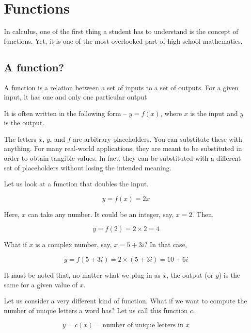 \chapter{Functions}
In calculus, one of the first thing a student has to understand is the concept of functions. Yet, it is one of the most overlooked part of high-school mathematics.

\section{A function?}

\begin{definition}[Function]
A function is a relation between a set of inputs to a set of outputs. For a given input, it has one and only one particular output
\end{definition}

It is often written in the following form -- $y = f(x)$, where $x$ is the input and $y$ is the output.

The letters $x$, $y$, and $f$ are arbitrary placeholders. You can substitute these with anything. For many real-world applications, they are meant to be substituted in order to obtain tangible values. In fact, they can be substituted with a different set of placeholders without losing the intended meaning.

Let us look at a function that doubles the input.

\begin{equation}
y = f(x) = 2x
\end{equation}

Here, $x$ can take any number. It could be an integer, say, $x = 2$. Then,

\[
y = f(2) = 2 \times 2 = 4
\]

What if $x$ is a complex number, say, $x = 5 + 3i$? In that case,

\[
y = f(5 + 3i) = 2 \times (5 + 3i) = 10 + 6i
\]

It must be noted that, no matter what we plug-in as $x$, the output (or $y$) is the same for a given value of $x$.

Let us consider a very different kind of function. What if we want to compute the number of unique letters a word has? Let us call this function $c$.

\begin{equation}
y = c(x) = \text{number of unique letters in $x$}
\label{eq:unique}
\end{equation}

